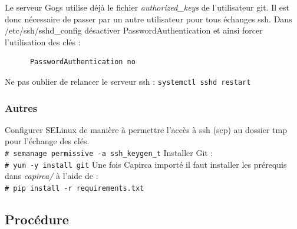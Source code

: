 \documentclass{article}
\newcommand{\shellcmdd}[1]{\\\indent\indent\texttt{\footnotesize\# #1}}
\begin{document}
      \noindent Le serveur Gogs utilise déjà le fichier \textit{authorized\_keys} de l'utilisateur git.
      Il est donc nécessaire de passer par un autre utilisateur pour tous échanges ssh. Dans /etc/ssh/sshd\_config désactiver PasswordAuthentication et ainsi forcer l'utilisation des clés :
\begin{verbatim}
      PasswordAuthentication no
\end{verbatim}
      \noindent Ne pas oublier de relancer le serveur ssh : \texttt{systemctl sshd restart}

    \subsubsection{Autres}

      \noindent Configurer SELinux de manière à permettre l'accès à ssh (scp) au dossier tmp pour l'échange des clés.
      \shellcmdd{semanage permissive -a ssh\_keygen\_t} \smallbreak
      \noindent Installer Git : \shellcmdd{yum -y install git} \smallbreak
      \noindent Une fois Capirca importé il faut installer les prérequis dans \textit{capirca/} à l'aide de :
      \shellcmdd{pip install -r requirements.txt}

    \subsection{Procédure}
\end{document}
